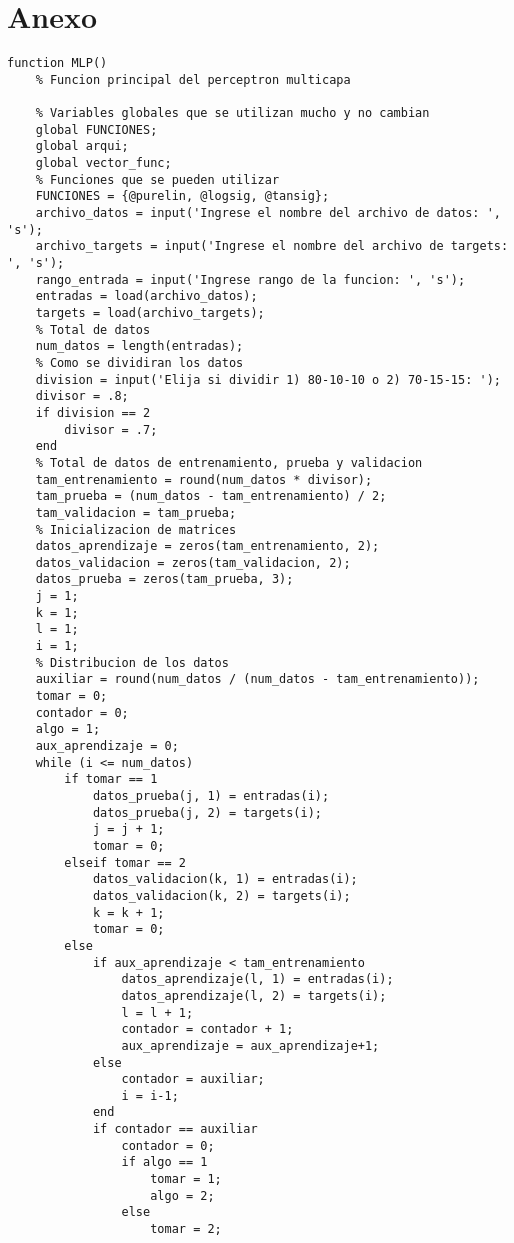 \section{Anexo}
\begin{lstlisting}
function MLP()
    % Funcion principal del perceptron multicapa
    
    % Variables globales que se utilizan mucho y no cambian
    global FUNCIONES;
    global arqui;
    global vector_func;
    % Funciones que se pueden utilizar
    FUNCIONES = {@purelin, @logsig, @tansig};
    archivo_datos = input('Ingrese el nombre del archivo de datos: ', 's');
    archivo_targets = input('Ingrese el nombre del archivo de targets: ', 's');
    rango_entrada = input('Ingrese rango de la funcion: ', 's');
    entradas = load(archivo_datos);
    targets = load(archivo_targets);
    % Total de datos 
    num_datos = length(entradas);
    % Como se dividiran los datos
    division = input('Elija si dividir 1) 80-10-10 o 2) 70-15-15: ');
    divisor = .8;
    if division == 2
        divisor = .7;
    end
    % Total de datos de entrenamiento, prueba y validacion
    tam_entrenamiento = round(num_datos * divisor);
    tam_prueba = (num_datos - tam_entrenamiento) / 2;
    tam_validacion = tam_prueba;
    % Inicializacion de matrices
    datos_aprendizaje = zeros(tam_entrenamiento, 2);
    datos_validacion = zeros(tam_validacion, 2);
    datos_prueba = zeros(tam_prueba, 3);
    j = 1;
    k = 1;
    l = 1;
    i = 1;
    % Distribucion de los datos
    auxiliar = round(num_datos / (num_datos - tam_entrenamiento));
    tomar = 0;
    contador = 0;
    algo = 1;
    aux_aprendizaje = 0;
    while (i <= num_datos)
        if tomar == 1
            datos_prueba(j, 1) = entradas(i);
            datos_prueba(j, 2) = targets(i);
            j = j + 1;
            tomar = 0;
        elseif tomar == 2
            datos_validacion(k, 1) = entradas(i);
            datos_validacion(k, 2) = targets(i);
            k = k + 1;
            tomar = 0;
        else
            if aux_aprendizaje < tam_entrenamiento
                datos_aprendizaje(l, 1) = entradas(i);
                datos_aprendizaje(l, 2) = targets(i);
                l = l + 1;
                contador = contador + 1;
                aux_aprendizaje = aux_aprendizaje+1;
            else
                contador = auxiliar;
                i = i-1;
            end
            if contador == auxiliar
                contador = 0;
                if algo == 1
                    tomar = 1;
                    algo = 2;
                else
                    tomar = 2;

\end{lstlisting}
